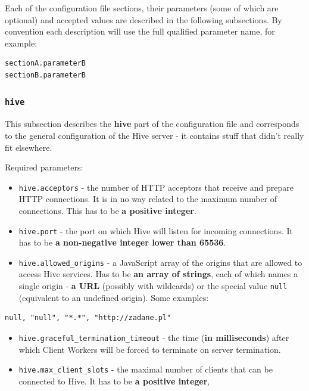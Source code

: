 \documentclass[a4paper]{article}
\begin{document}
Each of the configuration file sections, their parameters (some of which are optional) and accepted values are described in the following subsections. By convention each description will use the full qualified parameter name, for example:


\begin{verbatim}
sectionA.parameterB
sectionB.parameterB
\end{verbatim}
\subsubsection{\texttt{hive}}
\label{sec-3-1-1}

This subsection describes the \textbf{hive} part of the configuration file and corresponds to the general configuration of the Hive server - it contains stuff that didn't really fit elsewhere.

\noindent
Required parameters:

\begin{itemize}
\item \texttt{hive.acceptors} - the number of HTTP acceptors that receive and prepare HTTP connections. It is in no way related to the maximum number of connections. This has to be \textbf{a positive integer}.
\item \texttt{hive.port} - the port on which Hive will listen for incoming connections. It has to be \textbf{a non-negative integer lower than 65536}.
\item \texttt{hive.allowed\_origins} - a JavaScript array of the origins that are allowed to access Hive services. Has to be \textbf{an array of strings}, each of which names a single origin - \textbf{a URL} (possibly with wildcards) or the special value \texttt{null} (equivalent to an undefined origin). Some examples:
\end{itemize}


\begin{verbatim}
null, "null", "*.*", "http://zadane.pl"
\end{verbatim}




\label{ref-graceful_config}

\begin{itemize}
\item \texttt{hive.graceful\_termination\_timeout} - the time (\textbf{in milliseconds}) after which Client Workers will be forced to terminate on server termination.
\item \texttt{hive.max\_client\_slots} - the maximal number of clients that can be connected to Hive. It has to be \textbf{a positive integer},
\end{itemize}
\end{document}
